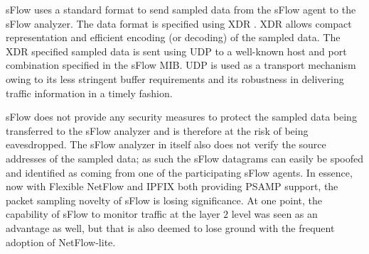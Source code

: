 sFlow uses a standard format to send sampled data from the sFlow agent to the sFlow analyzer. The data format is specified using \ac{XDR} \cite{rfc1014}. \ac{XDR} allows compact representation and efficient encoding (or decoding) of the sampled data. The  \ac{XDR} specified sampled data is sent using \ac{UDP} to a well-known host and port combination specified in the sFlow \ac{MIB}. \ac{UDP} is used as a transport mechanism owing to its less stringent buffer requirements and its robustness in delivering traffic information in a timely fashion.  

sFlow does not provide any security measures to protect the sampled data being transferred to the sFlow analyzer and is therefore at the risk of being eavesdropped. The sFlow analyzer in itself also does not verify the source addresses of the sampled data; as such the sFlow datagrams can easily be spoofed and identified as coming from  one of the participating sFlow agents. In essence, now with Flexible NetFlow and \ac{IPFIX} both providing \ac{PSAMP} support, the packet sampling novelty of sFlow is losing significance. At one point, the capability of sFlow to monitor traffic at the layer $2$ level was seen as an advantage as well, but that is also deemed to lose ground with the frequent adoption of NetFlow-lite.